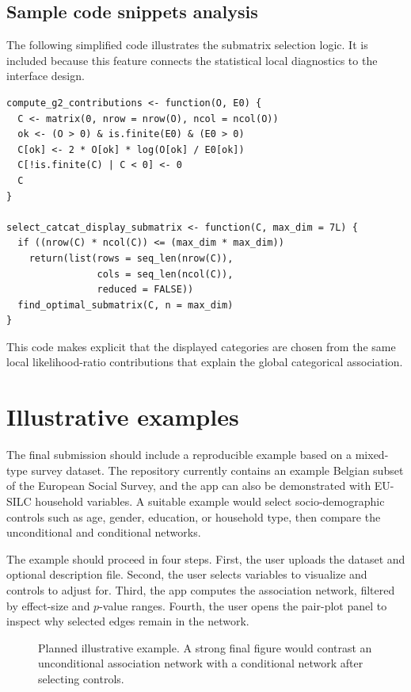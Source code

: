 \documentclass[preprint,12pt,a4paper]{elsarticle}
\begin{document}
\subsection{Sample code snippets analysis}

The following simplified code illustrates the submatrix selection logic. It is included because this feature connects the statistical local diagnostics to the interface design.

\begin{verbatim}
compute_g2_contributions <- function(O, E0) {
  C <- matrix(0, nrow = nrow(O), ncol = ncol(O))
  ok <- (O > 0) & is.finite(E0) & (E0 > 0)
  C[ok] <- 2 * O[ok] * log(O[ok] / E0[ok])
  C[!is.finite(C) | C < 0] <- 0
  C
}

select_catcat_display_submatrix <- function(C, max_dim = 7L) {
  if ((nrow(C) * ncol(C)) <= (max_dim * max_dim))
    return(list(rows = seq_len(nrow(C)),
                cols = seq_len(ncol(C)),
                reduced = FALSE))
  find_optimal_submatrix(C, n = max_dim)
}
\end{verbatim}

This code makes explicit that the displayed categories are chosen from the same local likelihood-ratio contributions that explain the global categorical association.

\section{Illustrative examples}

The final submission should include a reproducible example based on a mixed-type survey dataset. The repository currently contains an example Belgian subset of the European Social Survey, and the app can also be demonstrated with EU-SILC household variables. A suitable example would select socio-demographic controls such as age, gender, education, or household type, then compare the unconditional and conditional networks.

The example should proceed in four steps. First, the user uploads the dataset and optional description file. Second, the user selects variables to visualize and controls to adjust for. Third, the app computes the association network, filtered by effect-size and $p$-value ranges. Fourth, the user opens the pair-plot panel to inspect why selected edges remain in the network.

\begin{figure}[!ht]
\centering
{}
\caption{Planned illustrative example. A strong final figure would contrast an unconditional association network with a conditional network after selecting controls.}
\label{fig:network-example}
\end{figure}
\end{document}
